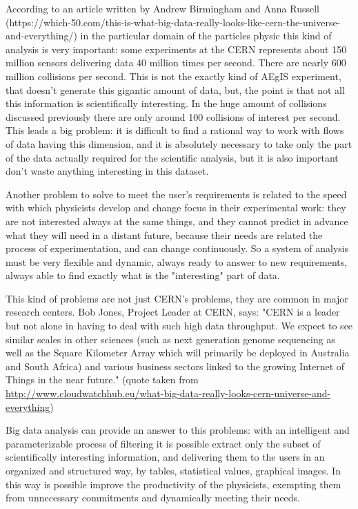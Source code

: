 According to an article written by Andrew Birmingham and Anna Russell (https://which-50.com/this-is-what-big-data-really-looks-like-cern-the-universe-and-everything/) in the particular domain of the particles physic this kind of analysis is very important: some experiments at the CERN represents about 150 million sensors delivering data 40 million times per second. There are nearly 600 million collisions per second. This is not the exactly kind of AEgIS experiment, that doesn't generate this gigantic amount of data, but, the point is that not all this information is scientifically interesting. In the huge amount of collisions discussed previously there are only around 100 collisions of interest per second.
This leads a big problem: it is difficult to find a rational way to work with flows of data having this dimension, and it is absolutely necessary to take only the part of the data actually required for the scientific analysis, but it is also important don't waste anything interesting in this dataset.

Another problem to solve to meet the user's requirements is related to the speed with which physicists develop and change focus in their experimental work: they are not interested always at the same things, and they cannot predict in advance what they will need in a distant future, because their needs are related the process of experimentation, and can change continuously. 
So a system of analysis must be very flexible and dynamic, always ready to answer to new requirements, always able to find exactly what is the "interesting" part of data.  

This kind of problems are not just CERN's problems, they are common in major research centers. Bob Jones, Project Leader at CERN, says:
"CERN is a leader but not alone in having to deal with such high data throughput. We expect to see similar scales in other sciences (such as next generation genome sequencing as well as the Square Kilometer Array which will primarily be deployed in Australia and South Africa) and various business sectors linked to the growing Internet of Things in the near future."
(quote taken from \url{http://www.cloudwatchhub.eu/what-big-data-really-looks-cern-universe-and-everything})
 
Big data analysis can provide an answer to this problems: with an intelligent and parameterizable process of filtering it is possible extract only the subset of scientifically interesting information, and delivering them to the users in an organized and structured way, by tables, statistical values, graphical images. 
In this way is possible improve the productivity of the physicists, exempting them from unnecessary commitments and dynamically meeting their needs. 


